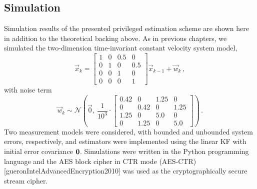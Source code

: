 \subsection{Simulation}\label{subsec:priv_estimation:est_simulation}
Simulation results of the presented privileged estimation scheme are shown here in addition to the theoretical backing above. As in previous chapters, we simulated the two-dimension time-invariant constant velocity system model,
\begin{equation}\label{eq:priv_estimation:est_simulation_system_model}
    \vec{x}_k = 
    \begin{bmatrix}
        1 & 0 & 0.5 & 0\\
        0 & 1 & 0 & 0.5\\
        0 & 0 & 1 & 0\\
        0 & 0 & 0 & 1
    \end{bmatrix}
    \vec{x}_{k-1} + \vec{w}_k\,,
\end{equation}
with noise term
\begin{equation}
    \vec{w}_k \sim \mathcal{N}\left(\vec{0},\ \frac{1}{10^{3}}\cdot
    \begin{bmatrix}
        0.42 & 0 & 1.25 & 0\\
        0 & 0.42 & 0 & 1.25\\
        1.25 & 0 & 5.0 & 0\\
        0 & 1.25 & 0 & 5.0
    \end{bmatrix}
    \right)\,.
\end{equation}
Two measurement models were considered, with bounded and unbounded system errors, respectively, and estimators were implemented using the linear KF with initial error covariance ${{\mathbf{0}}}$. Simulations were written in the Python programming language and the AES block cipher in CTR mode (AES-CTR) [gueronIntelAdvancedEncryption2010] was used as the cryptographically secure stream cipher.

